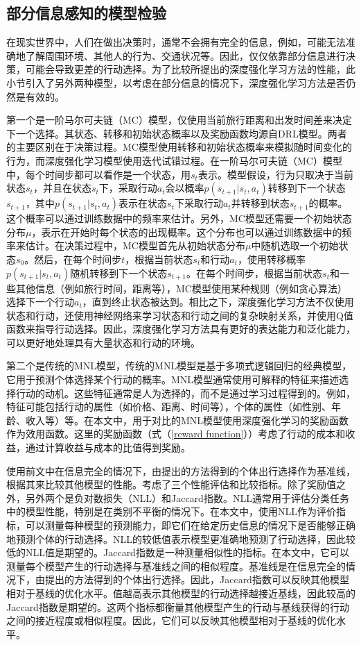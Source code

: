 \subsection{部分信息感知的模型检验}

在现实世界中，人们在做出决策时，通常不会拥有完全的信息，例如，可能无法准确地了解周围环境、其他人的行为、交通状况等。因此，仅仅依靠部分信息进行决策，可能会导致更差的行动选择。为了比较所提出的深度强化学习方法的性能，此小节引入了另外两种模型，以考虑在部分信息的情况下，深度强化学习方法是否仍然是有效的。

第一个是一阶马尔可夫链（MC）模型，仅使用当前旅行距离和出发时间差来决定下一个选择。其状态、转移和初始状态概率以及奖励函数均源自DRL模型。两者的主要区别在于决策过程。MC模型使用转移和初始状态概率来模拟随时间变化的行为，而深度强化学习模型使用迭代试错过程。在一阶马尔可夫链（MC）模型中，每个时间步都可以看作是一个状态，用$s_t$表示。模型假设，行为只取决于当前状态$s_t$，并且在状态$s_t$下，采取行动$a_t$会以概率$p(s_{t+1}|s_t, a_t)$转移到下一个状态$s_{t+1}$，其中$p(s_{t+1}|s_t, a_t)$表示在状态$s_t$下采取行动$a_t$并转移到状态$s_{t+1}$的概率。这个概率可以通过训练数据中的频率来估计。另外，MC模型还需要一个初始状态分布$\mu$，表示在开始时每个状态的出现概率。这个分布也可以通过训练数据中的频率来估计。在决策过程中，MC模型首先从初始状态分布$\mu$中随机选取一个初始状态$s_0$。然后，在每个时间步$t$，根据当前状态$s_t$和行动$a_t$，使用转移概率$p(s_{t+1}|s_t, a_t)$随机转移到下一个状态$s_{t+1}$。在每个时间步，根据当前状态$s_t$和一些其他信息（例如旅行时间，距离等），MC模型使用某种规则（例如贪心算法）选择下一个行动$a_t$，直到终止状态被达到。相比之下，深度强化学习方法不仅使用状态和行动，还使用神经网络来学习状态和行动之间的复杂映射关系，并使用Q值函数来指导行动选择。因此，深度强化学习方法具有更好的表达能力和泛化能力，可以更好地处理具有大量状态和行动的环境。

第二个是传统的MNL模型，传统的MNL模型是基于多项式逻辑回归的经典模型，它用于预测个体选择某个行动的概率。MNL模型通常使用可解释的特征来描述选择行动的动机。这些特征通常是人为选择的，而不是通过学习过程得到的。例如，特征可能包括行动的属性（如价格、距离、时间等），个体的属性（如性别、年龄、收入等）等。在本文中，用于对比的MNL模型使用深度强化学习的奖励函数作为效用函数。这里的奖励函数（式（\ref{reward function}））考虑了行动的成本和收益，通过计算收益与成本的比值得到奖励。

使用前文中在信息完全的情况下，由提出的方法得到的个体出行选择作为基准线，根据其来比较其他模型的性能。考虑了三个性能评估和比较指标。除了奖励值之外，另外两个是负对数损失（NLL）和Jaccard指数。NLL通常用于评估分类任务中的模型性能，特别是在类别不平衡的情况下。在本文中，使用NLL作为评价指标，可以测量每种模型的预测能力，即它们在给定历史信息的情况下是否能够正确地预测个体的行动选择。NLL的较低值表示模型更准确地预测了行动选择，因此较低的NLL值是期望的。Jaccard指数是一种测量相似性的指标。在本文中，它可以测量每个模型产生的行动选择与基准线之间的相似程度。基准线是在信息完全的情况下，由提出的方法得到的个体出行选择。因此，Jaccard指数可以反映其他模型相对于基线的优化水平。值越高表示其他模型的行动选择越接近基线，因此较高的Jaccard指数是期望的。这两个指标都衡量其他模型产生的行动与基线获得的行动之间的接近程度或相似程度。因此，它们可以反映其他模型相对于基线的优化水平。


